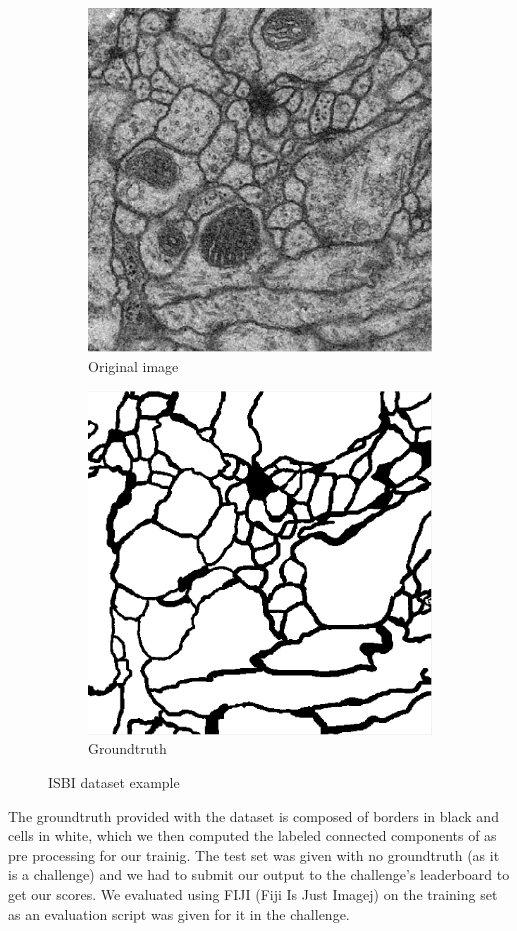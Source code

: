 \begin{figure}[!htbp]
    \centering
	\begin{subfigure}[t]{0.31\textwidth}
        \centering
        \includegraphics[height=0.7\textwidth]{./images/isbi_orig_1.png}
        \caption{Original image}
    \end{subfigure}%
    \begin{subfigure}[t]{0.31\textwidth}
        \centering
        \includegraphics[height=0.7\textwidth]{./images/isbi_gt_1.png}
        \caption{Groundtruth}
    \end{subfigure}
    \caption{ISBI dataset example}
	\label{fig:isbi_example}
\end{figure}

The groundtruth provided with the dataset is composed of borders in black and
cells in white, which we then computed the labeled connected components of as pre
processing for our trainig.
The test set was given with no groundtruth (as it is a challenge) and we had to
submit our output to the challenge's leaderboard to get our scores.
We evaluated using FIJI (Fiji Is Just Imagej) on the training set as an evaluation script was given
for it in the challenge.\\

